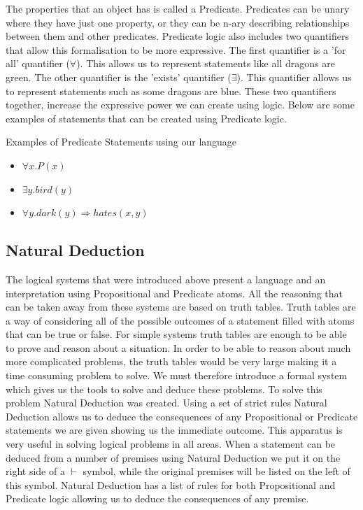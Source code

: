 The properties that an object has is called a Predicate. Predicates can be unary where they have just one property, or they can be n-ary describing relationships between them and other predicates. Predicate logic also includes two quantifiers that allow this formalisation to be more expressive. The first quantifier is a 'for all' quantifier ($\forall$). This allows us to represent statements like all dragons are green. The other quantifier is the 'exists' quantifier ($\exists$). This quantifier allows us to represent statements such as some dragons are blue. These two quantifiers together, increase the expressive power we can create using logic. Below are some examples of statements that can be created using Predicate logic.

\begin{exmp}Examples of Predicate Statements using our language
\begin{itemize}
\item $\forall x.P(x)$
\item $\exists y.bird(y)$
\item $\forall y.dark(y) \Rightarrow hates(x,y)$
\end{itemize}
\end{exmp}

\subsection{Natural Deduction}

The logical systems that were introduced above present a language and an interpretation using Propositional and Predicate atoms. All the reasoning that can be taken away from these systems are based on truth tables. Truth tables are a way of considering all of the possible outcomes of a statement filled with atoms that can be true or false. For simple systems truth tables are enough to be able to prove and reason about a situation. In order to be able to reason about much more complicated problems, the truth tables would be very large making it a time consuming problem to solve. We must therefore introduce a formal system which gives us the tools to solve and deduce these problems. To solve this problem Natural Deduction was created. Using a set of strict rules Natural Deduction allows us to deduce the consequences of any Propositional or Predicate statements we are given showing us the immediate outcome. This apparatus is very useful in solving logical problems in all areas. When a statement can be deduced from a number of premises using Natural Deduction we put it on the right side of a $\vdash$ symbol, while the original premises will be listed on the left of this symbol. Natural Deduction has a list of rules for both Propositional and Predicate logic allowing us to deduce the consequences of any premise. 

